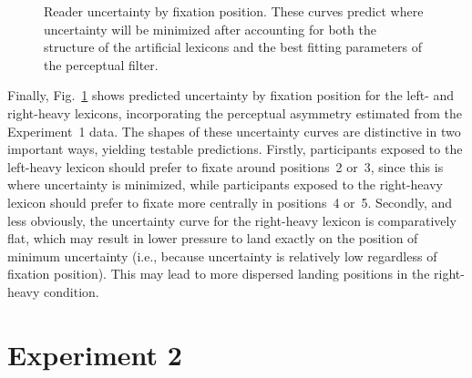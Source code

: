\documentclass[doc,biblatex]{apa7}
\begin{document}
\begin{figure}
\vspace*{2pt}
\caption{Reader uncertainty by fixation position. These curves predict where uncertainty will be minimized after accounting for both the structure of the artificial lexicons and the best fitting parameters of the perceptual filter.}
\label{fig08}
\end{figure}

Finally, Fig.~\ref{fig08} shows predicted uncertainty by fixation position for the left- and right-heavy lexicons, incorporating the perceptual asymmetry estimated from the Experiment~1 data. The shapes of these uncertainty curves are distinctive in two important ways, yielding testable predictions. Firstly, participants exposed to the left-heavy lexicon should prefer to fixate around positions~2 or~3, since this is where uncertainty is minimized, while participants exposed to the right-heavy lexicon should prefer to fixate more centrally in positions~4 or~5. Secondly, and less obviously, the uncertainty curve for the right-heavy lexicon is comparatively flat, which may result in lower pressure to land exactly on the position of minimum uncertainty (i.e., because uncertainty is relatively low regardless of fixation position). This may lead to more dispersed landing positions in the right-heavy condition.

\section{Experiment 2}
\end{document}
